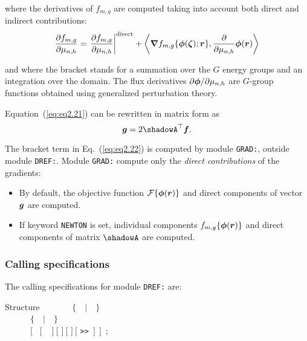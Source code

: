 \noindent where the derivatives of $f_{m,g}$ are computed taking into account both direct and indirect contributions:
\begin{equation}
{\partial  f_{m,g} \over  \partial \mu_{n,h}}=\left.{\partial  f_{m,g} \over  \partial \mu_{n,h}}\right|^{\rm direct}+\left< \bff(\nabla) f_{m,g}\{\bff(\phi)(\bff(\zeta));\bff(r)\},{\partial\over \partial\mu_{n,h}}\bff(\phi)(\bff(r))\right>
\label{eq:eq2.22}
\end{equation}

\noindent and where the bracket stands for a summation over the $G$ energy groups and an integration over the domain. The flux derivatives $\partial\bff(\phi) / \partial\mu_{n,h}$ are $G$-group functions obtained using generalized perturbation theory.

\vskip 0.08cm

Equation~(\ref{eq:eq2.21}) can be rewritten in matrix form as
\begin{equation}
\bff(g)=2 \shadowA^\top \bff(f) .
\label{eq:eq2.23}
\end{equation}

\vskip 0.08cm

The bracket term in Eq.~(\ref{eq:eq2.22}) is computed by module {\tt GRAD:}, outside module {\tt DREF:}. Module
{\tt GRAD:} compute only the {\sl direct contributions} of the gradients:
\begin{itemize}
\item By default, the objective function ${\cal F}\{\bff(\phi)(\bff(r))\}$ and direct components of vector $\bff(g)$ are computed.
\item If keyword {\tt NEWTON} is set, individual components $f_{m,g}\{\bff(\phi)(\bff(r))\}$ and direct components of matrix $\shadowA$ are computed.
\end{itemize}

\subsubsection{Calling specifications}

The calling specifications for module {\tt DREF:} are:

\begin{DataStructure}{Structure }
~~\moc{:=}~~~~~$\{$~~$|$~~$\}$ \\
~~~~~~$\{$~~$|$~~$\}$ \\
~~~~~~$[$ \moc{::}~$[$ ~ $]~[$  $]~[$  $]~[$  {\tt>>}~$]~~]$~;
\end{DataStructure}

